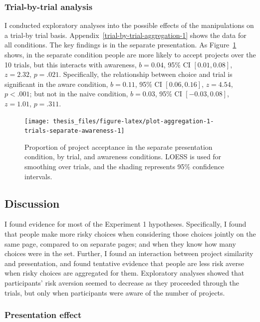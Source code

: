 \documentclass[a4paper, nobind, dvipsnames]{templates/ociamthesis}
\theoremstyle{definition}
\theoremstyle{definition}
\theoremstyle{definition}
\theoremstyle{definition}
\theoremstyle{remark}
\begin{document}
\subsubsection{Trial-by-trial analysis}

I conducted exploratory analyses into the possible effects of the manipulations
on a trial-by trial basis. Appendix~\ref{trial-by-trial-aggregation-1} shows
the data for all conditions. The key findings is in the separate presentation.
As Figure~\ref{fig:plot-aggregation-1-trials-separate-awareness} shows, in the
separate condition people are more likely to accept projects over the 10 trials,
but this interacts with awareness,
\(b = 0.04\), 95\% CI \([0.01, 0.08]\), \(z = 2.32\), \(p = .021\).
Specifically, the relationship between choice and trial is significant in the
aware condition,
\(b = 0.11\), 95\% CI \([0.06, 0.16]\), \(z = 4.54\), \(p < .001\); but not in the
naive condition,
\(b = 0.03\), 95\% CI \([-0.03, 0.08]\), \(z = 1.01\), \(p = .311\).



\begin{figure}
\texttt{[image: thesis\_files/figure-latex/plot-aggregation-1-trials-separate-awareness-1]} \caption{Proportion of project acceptance in the separate presentation condition, by trial, and awareness conditions. LOESS is used for smoothing over trials, and the shading represents 95\% confidence intervals.}\label{fig:plot-aggregation-1-trials-separate-awareness}
\end{figure}

\hypertarget{discussion-aggregation-1}{%
\subsection{Discussion}\label{discussion-aggregation-1}}

I found evidence for most of the Experiment 1 hypotheses. Specifically, I found
that people make more risky choices when considering those choices jointly on
the same page, compared to on separate pages; and when they know how many
choices were in the set. Further, I found an interaction between project
similarity and presentation, and found tentative evidence that people are less
risk averse when risky choices are aggregated for them. Exploratory analyses
showed that participants' risk aversion seemed to decrease as they proceeded
through the trials, but only when participants were aware of the number of
projects.

\subsubsection{Presentation effect}
\end{document}
